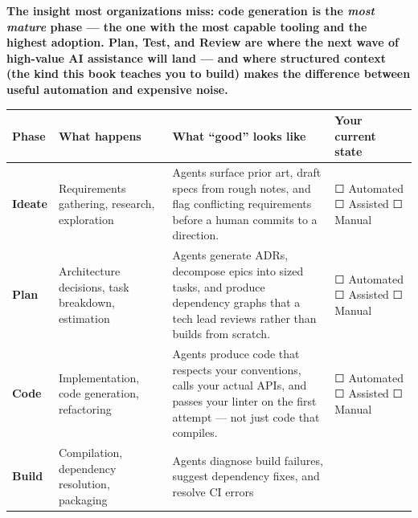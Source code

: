 \documentclass[
  a4paper,
  DIV=11,
  numbers=noendperiod]{scrreprt}
\newcounter{none} %
\begin{document}
\textbf{The insight most organizations miss: code generation is the
\emph{most mature} phase --- the one with the most capable tooling and
the highest adoption. Plan, Test, and Review are where the next wave of
high-value AI assistance will land --- and where structured context (the
kind this book teaches you to build) makes the difference between useful
automation and expensive noise.}

{\def\LTcaptype{none} %
\begin{longtable}[]{@{}
  >{\raggedright\arraybackslash}p{}
  >{\raggedright\arraybackslash}p{}
  >{\raggedright\arraybackslash}p{}
  >{\raggedright\arraybackslash}p{}@{}}
\toprule\noalign{}
\begin{minipage}[b]{\linewidth}\raggedright
Phase
\end{minipage} & \begin{minipage}[b]{\linewidth}\raggedright
What happens
\end{minipage} & \begin{minipage}[b]{\linewidth}\raggedright
What ``good'' looks like
\end{minipage} & \begin{minipage}[b]{\linewidth}\raggedright
Your current state
\end{minipage} \\
\midrule\noalign{}
\endhead
\bottomrule\noalign{}
\endlastfoot
\textbf{Ideate} & Requirements gathering, research, exploration & Agents
surface prior art, draft specs from rough notes, and flag conflicting
requirements before a human commits to a direction. & ☐ Automated ☐
Assisted ☐ Manual \\
\textbf{Plan} & Architecture decisions, task breakdown, estimation &
Agents generate ADRs, decompose epics into sized tasks, and produce
dependency graphs that a tech lead reviews rather than builds from
scratch. & ☐ Automated ☐ Assisted ☐ Manual \\
\textbf{Code} & Implementation, code generation, refactoring & Agents
produce code that respects your conventions, calls your actual APIs, and
passes your linter on the first attempt --- not just code that compiles.
& ☐ Automated ☐ Assisted ☐ Manual \\
\textbf{Build} & Compilation, dependency resolution, packaging & Agents
diagnose build failures, suggest dependency fixes, and resolve CI errors

\end{longtable}}
\end{document}
